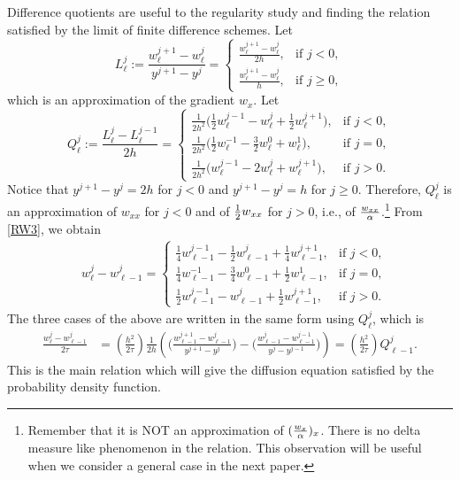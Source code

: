 \documentclass[11pt]{amsart}
\def\l{{h}}
\begin{document}
Difference quotients are useful to the regularity study and finding the relation satisfied by the limit of finite difference schemes. Let
\begin{equation}\label{Ljl}
L^j_\ell := \frac{w_\ell^{j+1}-w_\ell^j}{y^{j+1}-y^j}
        =\left\{\begin{array}{ll}
        \frac{w^{j+1}_{\ell} - w^{j}_{\ell}}{2\l}, & \text{if $j<0$},\\
        \frac{w^{j+1}_{\ell} - w^{j}_{\ell}}{\l}, & \text{if }  j\ge0,
        \end{array}\right.
\end{equation}
which is an approximation of the gradient $w_x$. Let
\begin{equation}\label{Qjl}
Q^j_\ell := \frac{L^j_\ell-L^{j-1}_\ell}{2h}= \left\{\begin{array}{ll}
        \frac{1}{2\l^2}\Big( \frac{1}{2} w^{j-1} _{\ell} - w ^{j} _{\ell} +
        \frac{1}{2} w^{j+1} _{\ell}\Big), & \text{if $j<0$},\\
        \frac{1}{2\l^2}\Big( \frac{1}{2} w^{-1} _{\ell} - \frac{3}{2}w
        ^{0} _{\ell} +w^{1} _{\ell}\Big), & \text{if $j=0$},\\
        \frac{1}{2\l^2}\Big(w^{j-1} _{\ell} - 2w^j_\ell + w ^{j+1}
        _{\ell}\Big), & \text{if $j>0$}.
        \end{array}\right.
\end{equation}
Notice that $y^{j+1}-y^{j}=2h$ for $j<0$ and $y^{j+1}-y^{j}=h$ for $j\ge0$. Therefore, $Q^j_\ell$ is an approximation of $w_{xx}$ for $j<0$ and of ${1\over2}w_{xx}$ for $j>0$, i.e., of ${w_{xx}\over\alpha}$.\footnote{Remember that it is NOT an approximation of $({w_x\over\alpha})_x$. There is no delta measure like phenomenon in the relation. This observation will be useful when we consider a general case in the next paper.} From \eqref{RW3}, we obtain
$$
\begin{aligned}
    &w^{j}_\ell-w^{j}_{\ell-1} = \left\{\begin{array}{ll}
        \frac{1}{4}w^{j-1} _{\ell-1} - \frac{1}{2}w ^{j} _{\ell-1} +
        \frac{1}{4} w^{j+1}_{\ell-1}, & \text{if $j<0$},\\
        \frac{1}{4}w^{-1} _{\ell-1} - \frac{3}{4}w^{0} _{\ell-1} +
        \frac{1}{2}w ^{1} _{\ell-1}, & \text{if $j=0$},\\
        \frac{1}{2}w^{j-1} _{\ell-1}-w^{j}_{\ell-1} + \frac{1}{2}w ^{j+1}
        _{\ell-1}, & \text{if } j>0.
        \end{array}\right.
\end{aligned}
$$
The three cases of the above are written in the same form using $Q_\ell^j$,
which is
\begin{equation} \label{RW1w}
\begin{aligned}
 \frac{w^j_\ell - w^j_{\ell-1}}{2\tau} &= \left(\frac{h^2}{2\tau}\right)
 \frac{1}{2h}\left( \Big(\tfrac{w^{j+1}_{\ell-1} -
 w^{j}_{\ell-1}}{y^{j+1}-y^j}\Big) -\Big(\tfrac{w^{j}_{\ell-1} -
 w^{j-1}_{\ell-1}}{y^{j}-y^{j-1}} \Big)\right)=
 \left(\frac{h^2}{2\tau}\right)Q^j_{\ell-1}.
  \end{aligned}
\end{equation}
This is the main relation which will give the diffusion equation satisfied by the probability density function.
\end{document}

